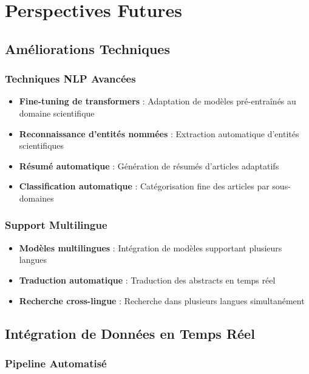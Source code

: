 \documentclass[12pt,a4paper]{article}
\begin{document}
\section{Perspectives Futures}

\subsection{Améliorations Techniques}

\subsubsection{Techniques NLP Avancées}

\begin{itemize}
    \item \textbf{Fine-tuning de transformers} : Adaptation de modèles pré-entraînés au domaine scientifique
    \item \textbf{Reconnaissance d'entités nommées} : Extraction automatique d'entités scientifiques
    \item \textbf{Résumé automatique} : Génération de résumés d'articles adaptatifs
    \item \textbf{Classification automatique} : Catégorisation fine des articles par sous-domaines
\end{itemize}

\subsubsection{Support Multilingue}

\begin{itemize}
    \item \textbf{Modèles multilingues} : Intégration de modèles supportant plusieurs langues
    \item \textbf{Traduction automatique} : Traduction des abstracts en temps réel
    \item \textbf{Recherche cross-lingue} : Recherche dans plusieurs langues simultanément
\end{itemize}

\subsection{Intégration de Données en Temps Réel}

\subsubsection{Pipeline Automatisé}
\end{document}
